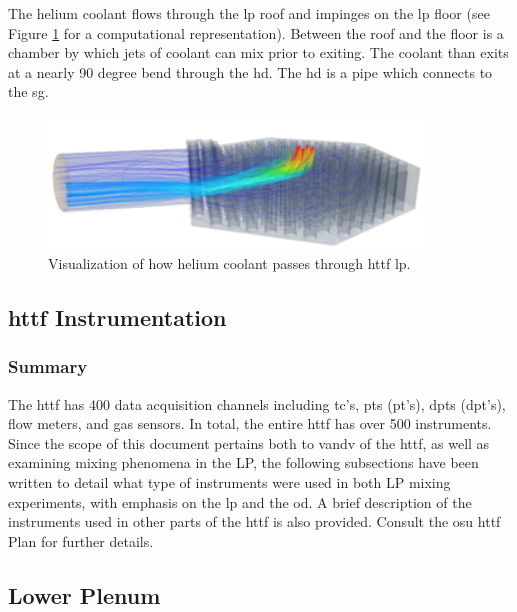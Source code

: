 \documentclass[double,12pt]{beavtex}
\begin{document}
The helium coolant flows through the \acrshort{lp} roof and impinges on the \acrshort{lp} floor (see Figure \ref{fig:LP_Velocity_Streamlines} for a computational representation). Between the roof and the floor is a chamber by which jets of coolant can mix prior to exiting. The coolant than exits at a nearly 90 degree bend through the \acrshort{hd}. The \acrshort{hd} is a pipe which connects to the \acrshort{sg}.

\begin{figure}
    \begin{center}
    	\includegraphics[width=10cm]{Figures/LP_Velocity_Streamlines}
    	\caption{Visualization of how helium coolant passes through \acrshort{httf} \acrshort{lp}.}
    	\label{fig:LP_Velocity_Streamlines}
    	\end{center}
\end{figure}

\subsection{\acrshort{httf} Instrumentation}

\subsubsection{Summary}

The \acrshort{httf} has 400 data acquisition channels including \acrshort{tc}'s, \acrlong{pt}s (\acrshort{pt}'s), \acrlong{dpt}s (\acrshort{dpt}'s), flow meters, and gas sensors. In total, the entire \acrshort{httf} has over 500 instruments. Since the scope of this document pertains both to \acrshort{vandv} of the \acrshort{httf}, as well as examining mixing phenomena in the LP, the following subsections have been written to detail what type of instruments were used in both LP mixing experiments, with emphasis on the \acrshort{lp} and the \acrshort{od}. A brief description of the instruments used in other parts of the \acrshort{httf} is also provided. Consult the \acrshort{osu} \acrshort{httf} Plan \cite{louria} for further details.

\subsection{Lower Plenum}
\end{document}
